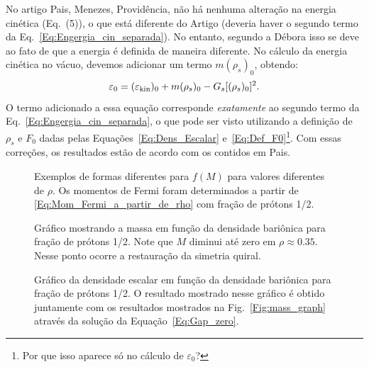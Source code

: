\begin{enumerate}
No artigo Pais, Menezes, Providência, não há nenhuma alteração na energia cinética (Eq.~(5)), o que está diferente do Artigo\cite{PRC_68_035804_2003} (deveria haver o segundo termo da Eq.~\eqref{Eq:Engergia_cin_separada}). No entanto, segundo a Débora isso se deve ao fato de que a energia é definida de maneira diferente. No cálculo da energia cinética no vácuo, devemos adicionar um termo $m (\rho_s)_0$, obtendo:
\begin{equation}
	\varepsilon_0 = (\varepsilon_{\rm{kin}})_0 + m (\rho_s)_0 - G_s [(\rho_s)_0]^2.
\end{equation}
%
O termo adicionado a essa equação corresponde \emph{exatamente} ao segundo termo da Eq.~\eqref{Eq:Engergia_cin_separada}, o que pode ser visto utilizando a definição de $\rho_s$ e $F_0$ dadas pelas Equações~\eqref{Eq:Dens_Escalar} e~\eqref{Eq:Def_F0}\footnote{Por que isso aparece só no cálculo de $\varepsilon_0$?}. Com essas correções, os resultados estão de acordo com os contidos em Pais\cite{Pais}.

\vspace{1cm}

\begin{figure}
	
	\caption{Exemplos de formas diferentes para $f(M)$ para valores diferentes de $\rho$. Os momentos de Fermi foram determinados a partir de \eqref{Eq:Mom_Fermi_a_partir_de_rho} com fração de prótons 1/2. \protect}
	\label{Fig:Gap_zero_graph_eNJL1m}
\end{figure}

\begin{figure}
	
	\caption{Gráfico mostrando a massa em função da densidade bariônica para fração de prótons 1/2. Note que $M$ diminui até zero em $\rho \approx 0.35$. Nesse ponto ocorre a restauração da simetria quiral. \protect}
	\label{Fig:mass_graph_eNJL1m}
\end{figure}

\begin{figure}
	
	\caption{Gráfico da densidade escalar em função da densidade bariônica para fração de prótons 1/2. O resultado mostrado nesse gráfico é obtido juntamente com os resultados mostrados na Fig.~\ref{Fig:mass_graph} através da solução da Equação~\ref{Eq:Gap_zero}. \protect}
	\label{Fig:scalar_density_graph_eNJL1m}
\end{figure}


\end{enumerate}
